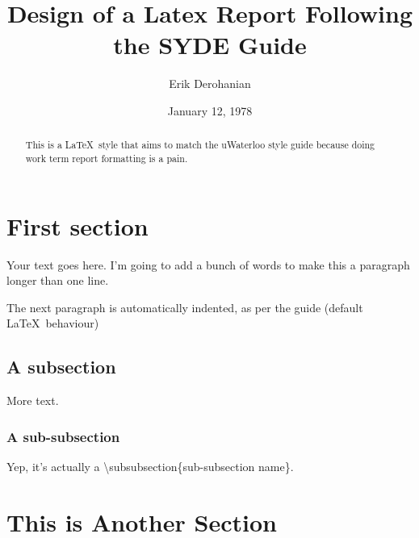 \documentclass[twoside, 12pt]{article}
\title{Design of a Latex Report Following the SYDE Guide}
\author{Erik Derohanian}
\date{January 12, 1978}
\begin{document}
	
	\makewtrtitle

	\begin{abstract}
		This is a \LaTeX\ style that aims to match the uWaterloo style guide because doing work term report formatting is a pain.
	\end{abstract}

	\tableofcontents
	\newpage

	\listoffigures
	\newpage
	\listoftables
	\newpage

	\startarabicpagenumbers

	\section{First section}

	Your text goes here. I'm going to add a bunch of words to make this a paragraph longer than one line.

	The next paragraph is automatically indented, as per the guide (default \LaTeX\ behaviour)

	\subsection{A subsection}

	More text.

	\subsubsection{A sub-subsection}

	Yep, it's actually a \textbackslash subsubsection\{sub-subsection name\}.

	\section{This is Another Section}
\end{document}
